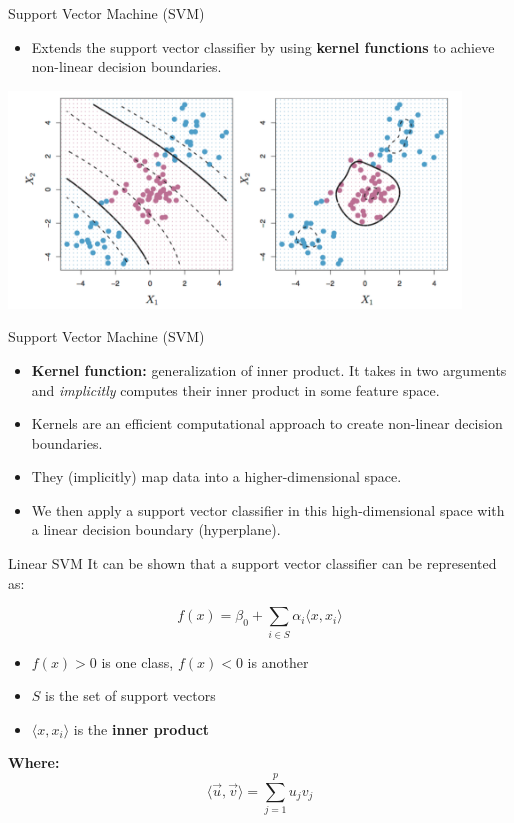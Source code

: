 \begin{frame}{Support Vector Machine (SVM)}
    \begin{itemize}
        \item Extends the support vector classifier by using \textbf{kernel functions} to achieve non-linear decision boundaries.
    \end{itemize}

    \centering
    \includegraphics[width=0.9\textwidth]{images/support-vector-machines/support-vector-machines-21.png}
\end{frame}


\begin{frame}{Support Vector Machine (SVM)}
    \begin{itemize}
        \item \textbf{Kernel function:} generalization of inner product. It takes in two arguments and \textit{implicitly} computes their inner product in some feature space.
        \item Kernels are an efficient computational approach to create non-linear decision boundaries.
        \item They (implicitly) map data into a higher-dimensional space.
        \item We then apply a support vector classifier in this high-dimensional space with a linear decision boundary (hyperplane).
    \end{itemize}
\end{frame}


\begin{frame}{Linear SVM}
    It can be shown that a support vector classifier can be represented as:

    \[
    f(x) = \beta_0 + \sum_{i \in S} \alpha_i \langle x, x_i \rangle
    \]

    
    \begin{itemize}
        \item $f(x) > 0$ is one class, $f(x) < 0$ is another
        \item $S$ is the set of support vectors
        \item $\langle x, x_i \rangle$ is the \textbf{inner product}
    \end{itemize}
    
    \textbf{Where:}
    \[
    \langle \vec{u}, \vec{v} \rangle = \sum_{j=1}^{p} u_j v_j
    \]
\end{frame}


